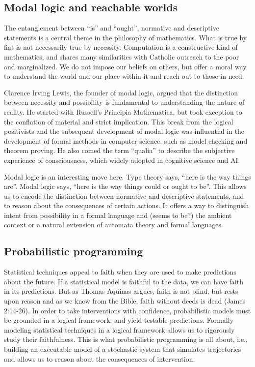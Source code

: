 \documentclass[sigplan,nonacm]{acmart}\settopmatter{printfolios=false,printccs=false,printacmref=false}
\begin{document}
  \subsection{Modal logic and reachable worlds}

  The entanglement between ``is'' and ``ought'', normative and descriptive statements is a central theme in the philosophy of mathematics. What is true by fiat is not necessarily true by necessity. Computation is a constructive kind of mathematics, and shares many similarities with Catholic outreach to the poor and marginalized. We do not impose our beliefs on others, but offer a moral way to understand the world and our place within it and reach out to those in need.

  Clarence Irving Lewis, the founder of modal logic, argued that the distinction between necessity and possibility is fundamental to understanding the nature of reality. He started with Russell's Principia Mathematica, but took exception to the conflation of material and strict implication. This break from the logical positivists and the subsequent development of modal logic was influential in the development of formal methods in computer science, such as model checking and theorem proving. He also coined the term ``qualia'' to describe the subjective experience of consciousness, which widely adopted in cognitive science and AI.

  Modal logic is an interesting move here. Type theory says, ``here is the way things are''. Modal logic says, ``here is the way things could or ought to be''. This allows us to encode the distinction between normative and descriptive statements, and to reason about the consequences of certain actions. It offers a way to distinguish intent from possibility in a formal language and (seems to be?) the ambient context or a natural extension of automata theory and formal languages.

  \subsection{Probabilistic programming}

  Statistical techniques appeal to faith when they are used to make predictions about the future. If a statistical model is faithful to the data, we can have faith in its predictions. But as Thomas Aquinas argues, faith is not blind, but rests upon reason and as we know from the Bible, faith without deeds is dead (James 2:14-26). In order to take interventions with confidence, probabilistic models must be grounded in a logical framework, and yield testable predictions. Formally modeling statistical techniques in a logical framework allows us to rigorously study their faithfulness. This is what probabilistic programming is all about, i.e., building an executable model of a stochastic system that simulates trajectories and allows us to reason about the consequences of intervention.
\end{document}

